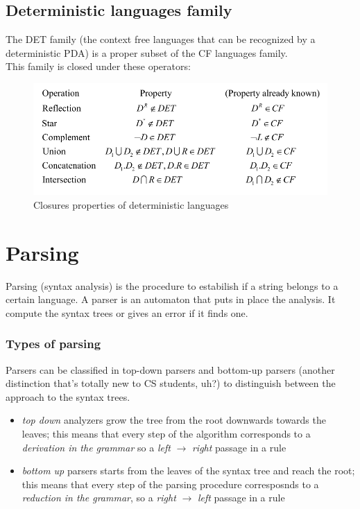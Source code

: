 \documentclass[10pt,a4paper]{article}
\begin{document}
			\subsection{Deterministic languages family}
				The DET family (the context free languages that can be recognized by a deterministic PDA) is a proper subset of the CF languages family.\\
				This family is closed under these operators:
				\begin{figure}[htp]
					\begin{center}
						\includegraphics[width = \textwidth]{./images/detClosures.png}
						\caption{Closures properties of deterministic languages}
					\end{center}
				\end{figure}
		
		\section{Parsing}
			Parsing (syntax analysis) is the procedure to estabilish if a string belongs to a certain language. A parser is an automaton that puts in place the analysis. It compute the syntax trees or gives an error if it finds one.
			
			\subsubsection{Types of parsing}
				Parsers can be classified in top-down parsers and bottom-up parsers (another distinction that's totally new to CS students, uh?) to distinguish between the approach to the syntax trees.
				\begin{itemize}
					\item \emph{top down} analyzers grow the tree from the root downwards towards the leaves; this means that every step of the algorithm corresponds to a \emph{derivation in the grammar} so a \emph{left} $\rightarrow$ \emph{right} passage in a rule
					\item \emph{bottom up} parsers starts from the leaves of the syntax tree and reach the root; this means that every step of the parsing procedure corresposnds to a \emph{reduction in the grammar}, so a \emph{right} $\rightarrow$ \emph{left} passage in a rule
				\end{itemize}
			
\end{document}
